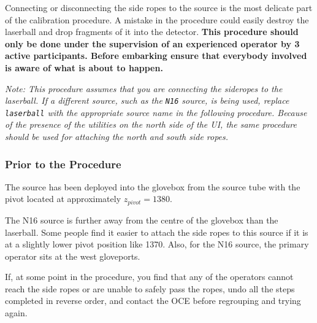 \documentclass[11pt]{article}
\begin{document}
Connecting or disconnecting the side ropes to the source is the most delicate part of the calibration procedure. A mistake in the procedure could easily destroy the laserball and drop fragments of it into the detector. {\bf This procedure should only be done under the supervision of an experienced operator by 3 active participants. Before embarking ensure that everybody involved is aware of what is about to happen.}

{\it Note: This procedure assumes that you are connecting the sideropes to the laserball. If a different source, such as the \verb+N16+ source, is being used, replace \verb+laserball+ with the appropriate source name in the following procedure. Because of the presence of the utilities on the north side of the UI, the same procedure should be used for attaching the north and south side ropes.}

\subsubsection{Prior to the Procedure}
The source has been deployed into the glovebox from the source tube with the pivot located at approximately $z_{pivot} = 1380$.

The N16 source is further away from the centre of the glovebox than the laserball. Some people find it easier to attach the side ropes to this source if it is at a slightly lower pivot position like 1370. Also, for the N16 source, the primary operator sits at the west gloveports.

If, at some point in the procedure, you find that any of the operators cannot reach the side ropes or are unable to safely pass the ropes, undo all the steps completed in reverse order, and contact the OCE before regrouping and trying again. 
\end{document}
